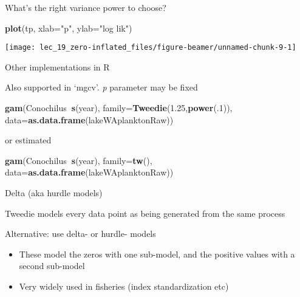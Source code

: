 \documentclass[ignorenonframetext,]{beamer}
\newenvironment{Shaded}{\begin{snugshade}}{\end{snugshade}}
\newcommand{\KeywordTok}[1]{\textcolor[rgb]{0.13,0.29,0.53}{\textbf{#1}}}
\newcommand{\DataTypeTok}[1]{\textcolor[rgb]{0.13,0.29,0.53}{#1}}
\newcommand{\DecValTok}[1]{\textcolor[rgb]{0.00,0.00,0.81}{#1}}
\newcommand{\FloatTok}[1]{\textcolor[rgb]{0.00,0.00,0.81}{#1}}
\newcommand{\StringTok}[1]{\textcolor[rgb]{0.31,0.60,0.02}{#1}}
\newcommand{\OperatorTok}[1]{\textcolor[rgb]{0.81,0.36,0.00}{\textbf{#1}}}
\newcommand{\NormalTok}[1]{#1}
\begin{document}
\begin{frame}[fragile]{What's the right variance power to choose?}

\begin{Shaded}
\begin{Highlighting}[]
\KeywordTok{plot}\NormalTok{(tp, }\DataTypeTok{xlab=}\StringTok{"p"}\NormalTok{, }\DataTypeTok{ylab=}\StringTok{"log lik"}\NormalTok{)}
\end{Highlighting}
\end{Shaded}

\begin{center}\texttt{[image: lec\_19\_zero-inflated\_files/figure-beamer/unnamed-chunk-9-1]} \end{center}

\end{frame}

\begin{frame}[fragile]{Other implementations in R}

Also supported in `mgcv'. \emph{p} parameter may be fixed

\begin{Shaded}
\begin{Highlighting}[]
\KeywordTok{gam}\NormalTok{(Conochilus}\OperatorTok{~}\KeywordTok{s}\NormalTok{(year), }\DataTypeTok{family=}\KeywordTok{Tweedie}\NormalTok{(}\FloatTok{1.25}\NormalTok{,}\KeywordTok{power}\NormalTok{(.}\DecValTok{1}\NormalTok{)),}
  \DataTypeTok{data=}\KeywordTok{as.data.frame}\NormalTok{(lakeWAplanktonRaw))}
\end{Highlighting}
\end{Shaded}

or estimated

\begin{Shaded}
\begin{Highlighting}[]
\KeywordTok{gam}\NormalTok{(Conochilus}\OperatorTok{~}\KeywordTok{s}\NormalTok{(year), }\DataTypeTok{family=}\KeywordTok{tw}\NormalTok{(),}
  \DataTypeTok{data=}\KeywordTok{as.data.frame}\NormalTok{(lakeWAplanktonRaw))}
\end{Highlighting}
\end{Shaded}

\end{frame}

\begin{frame}{Delta (aka hurdle models)}

Tweedie models every data point as being generated from the same process

Alternative: use delta- or hurdle- models

\begin{itemize}
\item
  These model the zeros with one sub-model, and the positive values with
  a second sub-model
\item
  Very widely used in fisheries (index standardization etc)
\end{itemize}

\end{frame}
\end{document}
